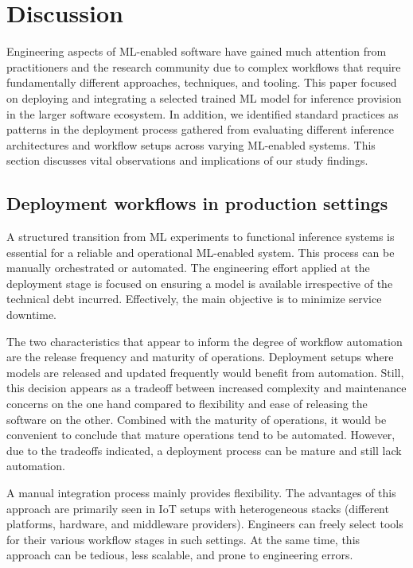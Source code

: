 \section{Discussion}
\label{sec: discussion}
Engineering aspects of ML-enabled software have gained much attention from practitioners and the research community due to
complex workflows that require fundamentally different approaches, techniques, and tooling. This paper focused on deploying and integrating a selected trained ML model for inference provision in the larger software ecosystem. In addition, we identified standard practices as patterns in the deployment process gathered from evaluating different inference architectures and workflow setups across varying ML-enabled systems. This section discusses vital observations and implications of our study findings.


\subsection{Deployment workflows in production settings}
 
A structured transition from ML experiments to functional inference systems is essential for a reliable and operational ML-enabled system. This process can be manually orchestrated or automated. The engineering effort applied at the deployment stage is focused on ensuring a model is available irrespective of the technical debt incurred. Effectively, the main objective is to minimize service downtime.

The two characteristics that appear to inform the degree of workflow automation are the release frequency and maturity of operations. Deployment setups where models are released and updated frequently would benefit from automation. Still, this decision appears as a tradeoff between increased complexity and maintenance concerns on the one hand compared to flexibility and ease of releasing the software on the other. Combined with the maturity of operations, it would be convenient to conclude that mature operations tend to be automated. However, due to the tradeoffs indicated, a deployment process can be mature and still lack automation.

A manual integration process mainly provides flexibility. The advantages of this approach are primarily seen in IoT setups with heterogeneous stacks (different platforms, hardware, and middleware providers). Engineers can freely select tools for their various workflow stages in such settings. At the same time, this approach can be tedious, less scalable, and prone to engineering errors.

